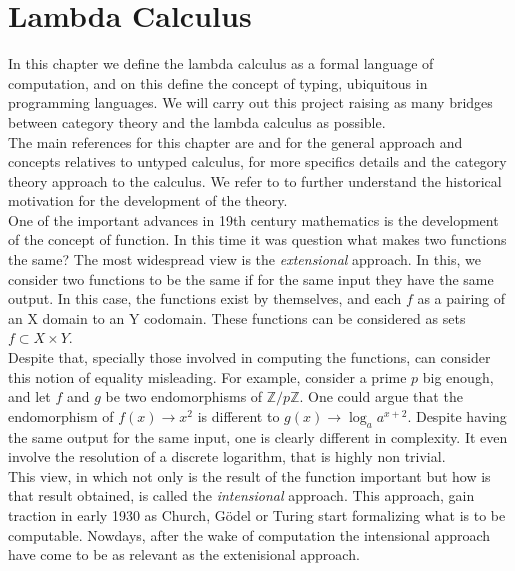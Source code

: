 
\chapter{Lambda Calculus}
\thispagestyle{empty}
In this chapter we define the lambda calculus as a formal language of computation, and on this define the concept of typing, ubiquitous in programming languages. We will carry out this project raising as many bridges between category theory and the lambda calculus as possible.\\

The main references for this chapter are \cite{selinger2008lecture} and \cite{hindley2008lambda} for the general approach and concepts relatives to untyped calculus, \cite{lambek1988introduction} for more specifics details and the category theory approach to the calculus. We refer to \cite{cardone2006history} to further understand the historical motivation for the development of the theory.  \\


One of the important advances in 19th century mathematics is the development of the concept of function. In this time it was question what makes two functions the same? The most widespread view is the \emph{extensional} approach. In this, we consider two functions to be the same if for the same input they have the same output. In this case, the functions exist by themselves, and each $f$ as a pairing of an X domain to an Y codomain. These functions can be considered as sets $f\subset X \times Y$.\\

Despite that, specially those involved in computing the functions, can consider this notion of equality misleading. For example, consider a prime $p$ big enough, and let $f$ and $g$ be two endomorphisms of  $\mathbb{Z}/p\mathbb{Z}$. One could argue that the endomorphism of  $f(x)\to x^2$ is different to $g(x) \to \log_a a^{x+2}$. Despite having the same output for the same input, one is clearly different in complexity. It even involve the resolution of a discrete logarithm, that is highly non trivial. \\

This view, in which not only is the result of the function important but how is that result obtained, is called the \emph{intensional} approach. This approach, gain traction in early 1930 as Church\cite{church1932set}, Gödel\cite{adams2011early} or Turing\cite{turing1938computable} start formalizing what is to be computable. Nowdays, after the wake of computation the intensional approach have come to be as relevant as the extenisional approach.%

